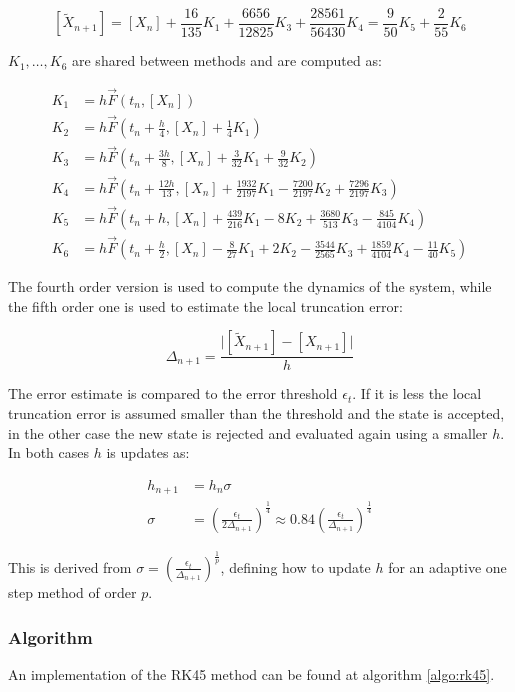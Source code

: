   $$[\tilde{X}_{n+1}] = [X_n] + \frac{16}{135}K_1 + \frac{6656}{12825}K_3 + \frac{28561}{56430}K_4 =\frac{9}{50}K_5 + \frac{2}{55}K_6$$

  $K_1,\dots, K_6$ are shared between methods and are computed as:

  \begin{align*}
    K_1 &=h\vec{F}(t_n, [X_n])\\
    K_2 &=h\vec{F}\left(t_n+\frac{h}{4}, [X_n]+\frac{1}{4}K_1\right)\\
    K_3 &=h\vec{F}\left(t_n+\frac{3h}{8}, [X_n]+\frac{3}{32}K_1+\frac{9}{32}K_2\right)\\
    K_4 &=h\vec{F}\left(t_n+\frac{12h}{13}, [X_n]+\frac{1932}{2197}K_1-\frac{7200}{2197}K_2+\frac{7296}{2197}K_3\right)\\
    K_5 &=h\vec{F}\left(t_n+h, [X_n]+\frac{439}{216}K_1-8K_2+\frac{3680}{513}K_3-\frac{845}{4104}K_4\right)\\
    K_6 &=h\vec{F}\left(t_n+\frac{h}{2}, [X_n]-\frac{8}{27}K_1+2K_2-\frac{3544}{2565}K_3+\frac{1859}{4104}K_4-\frac{11}{40}K_5\right)
  \end{align*}

  The fourth order version is used to compute the dynamics of the system, while the fifth order one is used to estimate the local truncation error:

  $$\Delta_{n+1} = \frac{\biggr\vert [\tilde{X}_{n+1}]-[X_{n+1}]\biggr\vert}{h}$$

  The error estimate is compared to the error threshold $\epsilon_t$.
  If it is less the local truncation error is assumed smaller than the threshold and the state is accepted, in the other case the new state is rejected and evaluated again using a smaller $h$.
  In both cases $h$ is updates as:

  \begin{align*}
    h_{n+1} &=h_n\sigma\\
    \sigma &= \left(\frac{\epsilon_t}{2\Delta_{n+1}}\right)^{\frac{1}{4}}\approx 0.84\left(\frac{\epsilon_t}{\Delta_{n+1}}\right)^{\frac{1}{4}}
  \end{align*}

  This is derived from $\sigma = \left(\frac{\epsilon_t}{\Delta_{n+1}}\right)^{\frac{1}{p}}$, defining how to update $h$ for an adaptive one step method of order $p$.

    \subsubsection{Algorithm}
    An implementation of the RK45 method can be found at algorithm \ref{algo:rk45}.

